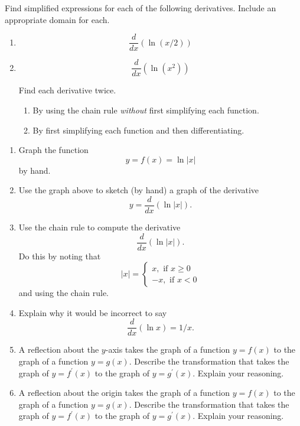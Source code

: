 \documentclass{ximera}
\begin{document}
\begin{question} \label{Qhhghgfgfdgghhfll}
Find simplified expressions for each of the following derivatives. Include an appropriate domain for each.

\begin{enumerate}
\item 
\[
   \frac{d}{dx} \left( \ln \left( x/2 \right) \right)
\]

\item 
\[
\frac{d}{dx} \left( \ln \left( x^2 \right) \right)
\]

Find each derivative twice.

\begin{enumerate}
\item By using the chain rule \emph{without} first simplifying each function.

\item By first simplifying each function and then differentiating.
\end{enumerate}

\end{enumerate}

\end{question}


\begin{question}  \label{Qggfdghbfrgbhrdtgr}
\begin{enumerate}
\item Graph the function 
\[
    y = f(x) = \ln |x|
\]
by hand.

\item Use the graph above to sketch (by hand) a graph of the derivative
\[
  y = \frac{d}{dx} \left( \ln |x|  \right) .
\]

\item Use the chain rule to compute the derivative
\[
   \frac{d}{dx} \left( \ln |x| \right) .
\]
Do this by noting that
\[
|x| = 
\begin{cases}
    x , \text{ if } x\geq 0 \\
   -x ,  \text{ if } x<0
\end{cases}
\]
and using the chain rule.

\item Explain why it would be incorrect to say
\[
   \frac{d}{dx} \left( \ln x \right) = 1/x.
\]

\item A reflection about the $y$-axis takes the graph of a function $y=f(x)$ to the graph of a function $y=g(x)$. Describe the transformation that takes the graph of $y=f^\prime(x)$ to the graph of $y=g^\prime(x)$. Explain your reasoning.

\item A reflection about the origin takes the graph of a function $y=f(x)$ to the graph of a function $y=g(x)$. Describe the transformation that takes the graph of $y=f^\prime(x)$ to the graph of $y=g^\prime(x)$. Explain your reasoning.

\end{enumerate}

\end{question}
\end{document}
